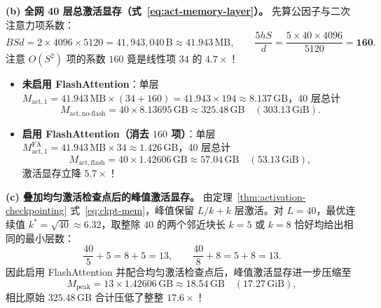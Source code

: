 \textbf{(b) 全网 40 层总激活显存（式~\eqref{eq:act-memory-layer}）。} 先算公因子与二次注意力项系数：
\[
  B S d = 2 \times 4096 \times 5120 = 41{,}943{,}040\,\mathrm{B} \approx 41.943\,\mathrm{MB}, \qquad
  \frac{5 h S}{d} = \frac{5 \times 40 \times 4096}{5120} = \mathbf{160}.
\]
注意 $O(S^2)$ 项的系数 $160$ 竟是线性项 $34$ 的 $4.7\times$！
\begin{itemize}
  \item \textbf{未启用 FlashAttention}：单层 $M_{\mathrm{act,1}} = 41.943\,\mathrm{MB} \times (34 + 160) = 41.943 \times 194 \approx 8.137\,\mathrm{GB}$，40 层总计
  \[
    M_{\mathrm{act,no\text{-}flash}} = 40 \times 8.13695\,\mathrm{GB} \approx \mathbf{325.48\,\mathrm{GB}} \quad (303.13\,\mathrm{GiB}).
  \]
  \item \textbf{启用 FlashAttention（消去 $160$ 项）}：单层 $M_{\mathrm{act,1}}^{\mathrm{FA}} = 41.943\,\mathrm{MB} \times 34 \approx 1.426\,\mathrm{GB}$，40 层总计
  \[
    M_{\mathrm{act,flash}} = 40 \times 1.42606\,\mathrm{GB} \approx \mathbf{57.04\,\mathrm{GB}} \quad (53.13\,\mathrm{GiB}),
  \]
  激活显存立降 $5.7\times$！
\end{itemize}

\textbf{(c) 叠加均匀激活检查点后的峰值激活显存。} 由定理~\ref{thm:activation-checkpointing} 式~\eqref{eq:ckpt-mem}，峰值保留 $L/k + k$ 层激活。对 $L = 40$，最优连续值 $k^* = \sqrt{40} \approx 6.32$，取整除 $40$ 的两个邻近块长 $k = 5$ 或 $k = 8$ 恰好均给出相同的最小层数：
\[
  \frac{40}{5} + 5 = 8 + 5 = 13, \qquad \frac{40}{8} + 8 = 5 + 8 = 13.
\]
因此启用 FlashAttention 并配合均匀激活检查点后，峰值激活显存进一步压缩至
\[
  M_{\mathrm{peak}} = 13 \times 1.42606\,\mathrm{GB} \approx \mathbf{18.54\,\mathrm{GB}} \quad (17.27\,\mathrm{GiB}),
\]
相比原始 $325.48\,\mathrm{GB}$ 合计压低了整整 $17.6\times$！



